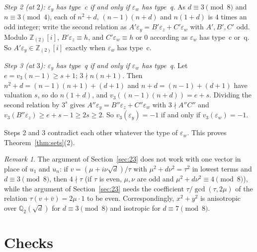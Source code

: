 \documentclass[11pt,a4paper]{amsart}
\theoremstyle{remark}
\newtheorem*{remark}{Remark}
\newcommand{\Q}{\mathbb{Q}}
\newcommand{\Z}{\mathbb{Z}}
\begin{document}
\emph{Step 2 (at $2$): $\varepsilon_y$ has type~c if and only if $\varepsilon_w$ has type~q.} As $d\equiv3\pmod8$
and $n\equiv3\pmod4$, each of $n^2+d$, $(n-1)(n+d)$ and $n(1+d)$ is $4$ times an odd integer; write the second
relation as $A'\varepsilon_y=B'\varepsilon_z+C'\varepsilon_w$ with $A',B',C'$ odd. Modulo $\Z_{(2)}[i]$,
$B'\varepsilon_z\equiv h$, and $C'\varepsilon_w\equiv h$ or $0$ according as $\varepsilon_w$ has type~c or~q. So
$A'\varepsilon_y\in\Z_{(2)}[i]$ exactly when $\varepsilon_w$ has type~c.

\emph{Step 3 (at $3$): $\varepsilon_y$ has type~q if and only if $\varepsilon_w$ has type~q.} Let
$e=v_3(n-1)\ge s+1$; $3\nmid n(n+1)$. Then $n^2+d=(n-1)(n+1)+(d+1)$ and $n+d=(n-1)+(d+1)$ have valuation $s$, so do
$n(1+d)$, and $v_3((n-1)(n+d))=e+s$. Dividing the second relation by $3^s$ gives
$A''\varepsilon_y=B''\varepsilon_z+C''\varepsilon_w$ with $3\nmid A''C''$ and
$v_3(B''\varepsilon_z)\ge e+s-1\ge2s\ge2$. So $v_3(\varepsilon_y)=-1$ if and only if $v_3(\varepsilon_w)=-1$.

Steps 2 and 3 contradict each other whatever the type of $\varepsilon_w$. This proves Theorem~\ref{thm:sets}(2).

\begin{remark}
The argument of Section~\ref{sec:23} does not work with one vector in place of $u_1$ and $u_n$: if
$v=(\mu+i\nu\sqrt d)/\tau$ with $\mu^2+d\nu^2=\tau^2$ in lowest terms and $d\equiv3\pmod8$, then $4\nmid\tau$ (if $\tau$ is even, $\mu,\nu$ are odd and $\mu^2+d\nu^2\equiv4\pmod8$), while the
argument of Section~\ref{sec:23} needs the coefficient $\tau/\gcd(\tau,2\mu)$ of the relation $\tau(v+\bar v)=2\mu\cdot1$
to be even. Correspondingly, $x^2+y^2$ is anisotropic over $\Q_2(\sqrt d)$ for $d\equiv3\pmod8$ and isotropic for
$d\equiv7\pmod8$.
\end{remark}

\section{Checks}\label{sec:checks}
\end{document}
